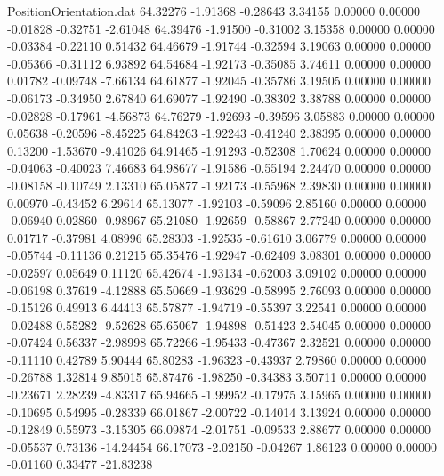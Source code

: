 \begin{filecontents}{PositionOrientation.dat}
  64.32276   -1.91368   -0.28643     3.34155    0.00000    0.00000   -0.01828   -0.32751   -2.61048
  64.39476   -1.91500   -0.31002     3.15358    0.00000    0.00000   -0.03384   -0.22110    0.51432
  64.46679   -1.91744   -0.32594     3.19063    0.00000    0.00000   -0.05366   -0.31112    6.93892
  64.54684   -1.92173   -0.35085     3.74611    0.00000    0.00000    0.01782   -0.09748   -7.66134
  64.61877   -1.92045   -0.35786     3.19505    0.00000    0.00000   -0.06173   -0.34950    2.67840
  64.69077   -1.92490   -0.38302     3.38788    0.00000    0.00000   -0.02828   -0.17961   -4.56873
  64.76279   -1.92693   -0.39596     3.05883    0.00000    0.00000    0.05638   -0.20596   -8.45225
  64.84263   -1.92243   -0.41240     2.38395    0.00000    0.00000    0.13200   -1.53670   -9.41026
  64.91465   -1.91293   -0.52308     1.70624    0.00000    0.00000   -0.04063   -0.40023    7.46683
  64.98677   -1.91586   -0.55194     2.24470    0.00000    0.00000   -0.08158   -0.10749    2.13310
  65.05877   -1.92173   -0.55968     2.39830    0.00000    0.00000    0.00970   -0.43452    6.29614
  65.13077   -1.92103   -0.59096     2.85160    0.00000    0.00000   -0.06940    0.02860   -0.98967
  65.21080   -1.92659   -0.58867     2.77240    0.00000    0.00000    0.01717   -0.37981    4.08996
  65.28303   -1.92535   -0.61610     3.06779    0.00000    0.00000   -0.05744   -0.11136    0.21215
  65.35476   -1.92947   -0.62409     3.08301    0.00000    0.00000   -0.02597    0.05649    0.11120
  65.42674   -1.93134   -0.62003     3.09102    0.00000    0.00000   -0.06198    0.37619   -4.12888
  65.50669   -1.93629   -0.58995     2.76093    0.00000    0.00000   -0.15126    0.49913    6.44413
  65.57877   -1.94719   -0.55397     3.22541    0.00000    0.00000   -0.02488    0.55282   -9.52628
  65.65067   -1.94898   -0.51423     2.54045    0.00000    0.00000   -0.07424    0.56337   -2.98998
  65.72266   -1.95433   -0.47367     2.32521    0.00000    0.00000   -0.11110    0.42789    5.90444
  65.80283   -1.96323   -0.43937     2.79860    0.00000    0.00000   -0.26788    1.32814    9.85015
  65.87476   -1.98250   -0.34383     3.50711    0.00000    0.00000   -0.23671    2.28239   -4.83317
  65.94665   -1.99952   -0.17975     3.15965    0.00000    0.00000   -0.10695    0.54995   -0.28339
  66.01867   -2.00722   -0.14014     3.13924    0.00000    0.00000   -0.12849    0.55973   -3.15305
  66.09874   -2.01751   -0.09533     2.88677    0.00000    0.00000   -0.05537    0.73136  -14.24454
  66.17073   -2.02150   -0.04267     1.86123    0.00000    0.00000   -0.01160    0.33477  -21.83238

\end{filecontents}
